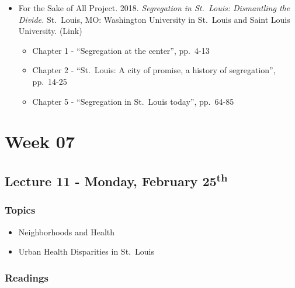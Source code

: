 \documentclass[]{book}
\providecommand{\tightlist}{%
  \setlength{\itemsep}{0pt}\setlength{\parskip}{0pt}}
\begin{document}
\begin{itemize}
\tightlist
\item
  For the Sake of All Project. 2018. \emph{Segregation in St.~Louis: Dismantling the Divide.} St.~Louis, MO: Washington University in St.~Louis and Saint Louis University. (Link)

  \begin{itemize}
  \tightlist
  \item
    Chapter 1 - ``Segregation at the center'', pp.~4-13
  \item
    Chapter 2 - ``St.~Louis: A city of promise, a history of segregation'', pp.~14-25
  \item
    Chapter 5 - ``Segregation in St.~Louis today'', pp.~64-85
  \end{itemize}
\end{itemize}

\hypertarget{week-07}{%
\section*{Week 07}\label{week-07}}

\hypertarget{lecture-11---monday-february-25th}{%
\subsection*{\texorpdfstring{Lecture 11 - Monday, February 25\textsuperscript{th}}{Lecture 11 - Monday, February 25th}}\label{lecture-11---monday-february-25th}}

\hypertarget{topics-12}{%
\subsubsection*{Topics}\label{topics-12}}

\begin{itemize}
\tightlist
\item
  Neighborhoods and Health
\item
  Urban Health Disparities in St.~Louis
\end{itemize}

\hypertarget{readings-11}{%
\subsubsection*{Readings}\label{readings-11}}
\end{document}
